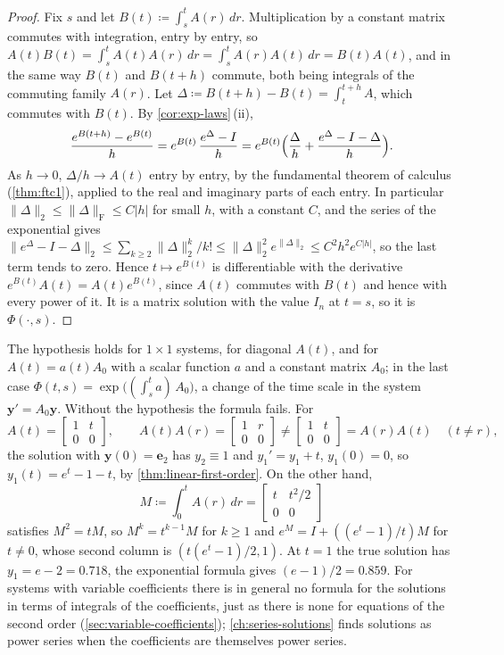 \begin{proof}
Fix $s$ and let $B(t)\coloneqq\int_s^tA(r)\,dr$. Multiplication by a constant matrix commutes with integration, entry by entry, so $A(t)B(t)=\int_s^tA(t)A(r)\,dr=\int_s^tA(r)A(t)\,dr=B(t)A(t)$, and in the same way $B(t)$ and $B(t+h)$ commute, both being integrals of the commuting family $A(r)$. Let $\Delta\coloneqq B(t+h)-B(t)=\int_t^{t+h}A$, which commutes with $B(t)$. By \cref{cor:exp-laws}\,(ii),
\[
\frac{e^{B(t+h)}-e^{B(t)}}h=e^{B(t)}\,\frac{e^\Delta-I}h=e^{B(t)}\Bigl(\frac\Delta h+\frac{e^\Delta-I-\Delta}h\Bigr).
\]
As $h\to0$, $\Delta/h\to A(t)$ entry by entry, by the fundamental theorem of calculus (\cref{thm:ftc1}), applied to the real and imaginary parts of each entry. In particular $\|\Delta\|_2\le\|\Delta\|_{\mathrm F}\le C|h|$ for small $h$, with a constant $C$, and the series of the exponential gives $\|e^\Delta-I-\Delta\|_2\le\sum_{k\ge2}\|\Delta\|_2^k/k!\le\|\Delta\|_2^2e^{\|\Delta\|_2}\le C^2h^2e^{C|h|}$, so the last term tends to zero. Hence $t\mapsto e^{B(t)}$ is differentiable with the derivative $e^{B(t)}A(t)=A(t)e^{B(t)}$, since $A(t)$ commutes with $B(t)$ and hence with every power of it. It is a matrix solution with the value $I_n$ at $t=s$, so it is $\Phi(\cdot,s)$.
\end{proof}

The hypothesis holds for $1\times1$ systems, for diagonal $A(t)$, and for $A(t)=a(t)A_0$ with a scalar function $a$ and a constant matrix $A_0$; in the last case $\Phi(t,s)=\exp\bigl((\int_s^ta)\,A_0\bigr)$, a change of the time scale in the system $\mathbf y'=A_0\mathbf y$. Without the hypothesis the formula fails. For
\[
A(t)=\begin{bmatrix}1&t\\0&0\end{bmatrix},\qquad A(t)A(r)=\begin{bmatrix}1&r\\0&0\end{bmatrix}\ne\begin{bmatrix}1&t\\0&0\end{bmatrix}=A(r)A(t)\quad(t\ne r),
\]
the solution with $\mathbf y(0)=\mathbf e_2$ has $y_2\equiv1$ and $y_1'=y_1+t$, $y_1(0)=0$, so $y_1(t)=e^t-1-t$, by \cref{thm:linear-first-order}. On the other hand,
\[
M\coloneqq\int_0^tA(r)\,dr=\begin{bmatrix}t&t^2/2\\0&0\end{bmatrix}
\]
satisfies $M^2=tM$, so $M^k=t^{k-1}M$ for $k\ge1$ and $e^M=I+((e^t-1)/t)M$ for $t\ne0$, whose second column is $(t(e^t-1)/2,1)$. At $t=1$ the true solution has $y_1=e-2=0.718$, the exponential formula gives $(e-1)/2=0.859$. For systems with variable coefficients there is in general no formula for the solutions in terms of integrals of the coefficients, just as there is none for equations of the second order (\cref{sec:variable-coefficients}); \cref{ch:series-solutions} finds solutions as power series when the coefficients are themselves power series.

